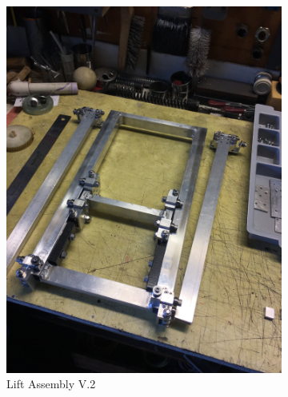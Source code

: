 \documentclass{article}
\begin{document}
  
\begin{figure}[h!]
\centering
\begin{subfigure}{.34\textwidth}
  \centering
  \includegraphics[width=\textwidth]{27_03-04/images/Lift2.JPG}
  \caption{Lift Assembly V.2}
  \label{fig:lift2}
 \end{subfigure}
\begin{subfigure}{.45\textwidth}
  \centering

\end{subfigure}
\end{figure}
\end{document}
